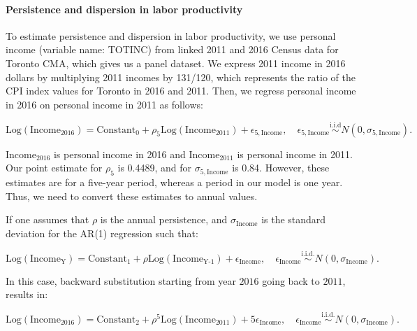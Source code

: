 \documentclass[parskip=full]{article}
\begin{document}
\paragraph{Persistence and dispersion in labor productivity}

To estimate persistence and dispersion in labor productivity, we use personal income (variable name: TOTINC) from linked 2011 and 2016 Census data for Toronto CMA, which gives us a panel dataset. We express 2011 income in 2016 dollars by multiplying 2011 incomes by 131/120, which represents the ratio of the CPI index values for Toronto in 2016 and 2011. Then, we regress personal income in 2016 on personal income in 2011 as follows:

\begin{equation*}
  \mbox{Log} \left(\mbox{Income}_{\mbox{2016}}\right) = \mbox{Constant}_{0}+\rho_{5} \mbox{Log} \left(\mbox{Income}_{\mbox{2011}}\right) + \epsilon_{5,\mbox{Income}},\quad \epsilon_{5,\mbox{Income}}\overset{\mathrm{i.i.d}}\sim N(0,\sigma_{5,\mbox{Income}}).
\end{equation*}

\noindent $\mbox{Income}_{\mbox{2016}}$ is personal income in 2016 and $\mbox{Income}_{\mbox{2011}}$ is personal income in 2011. Our point estimate for $\rho_{5}$ is 0.4489, and for $\sigma_{5,\mbox{Income}}$ is 0.84. However, these estimates are for a five-year period, whereas a period in our model is one year. Thus, we need to convert these estimates to annual values. 

If one assumes that $\rho$ is the annual persistence, and $\sigma_{\mbox{Income}}$ is the standard deviation for the AR(1) regression such that:

\begin{equation*}
  \mbox{Log} \left(\mbox{Income}_{\mbox{Y}}\right) = \mbox{Constant}_{1}+\rho \mbox{Log} \left(\mbox{Income}_{\mbox{Y-1}}\right) + \epsilon_{\mbox{Income}},\quad \epsilon_{\mbox{Income}}\overset{\mathrm{i.i.d.}} \sim N(0,\sigma_{\mbox{Income}}).
\end{equation*}

\noindent In this case, backward substitution starting from year $2016$ going back to $2011$, results in:

\begin{equation*}
  \mbox{Log} \left(\mbox{Income}_{\mbox{2016}}\right) = \mbox{Constant}_{2}+\rho^{5} \mbox{Log} \left(\mbox{Income}_{\mbox{2011}}\right) + 5\epsilon_{\mbox{Income}},\quad \epsilon_{\mbox{Income}} \overset{\mathrm{i.i.d.}}\sim N(0,\sigma_{\mbox{Income}}).
\end{equation*}
\end{document}
